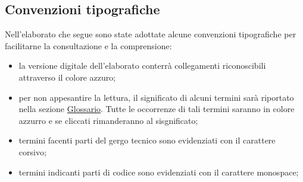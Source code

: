 \subsection*{Convenzioni tipografiche}
Nell’elaborato che segue sono state adottate alcune convenzioni tipografiche per
facilitarne la consultazione e la comprensione:
\begin{itemize}
	\item la versione digitale dell’elaborato conterrà collegamenti riconoscibili attraverso il
	colore azzuro;
	\item per non appesantire la lettura, il significato di alcuni termini sarà riportato nella
	sezione \hyperlink{Glossario}{Glossario}. Tutte le occorrenze di tali termini saranno in colore
	azzurro e se cliccati rimanderanno al sisgnificato;
	\item termini facenti parti del gergo tecnico sono evidenziati con il carattere corsivo;
	\item termini indicanti parti di codice sono evidenziati con il carattere monospace;
\end{itemize}
%
%

\endgroup			

\vfill

